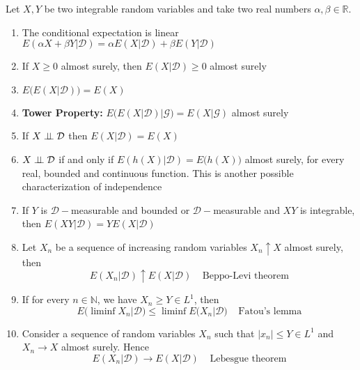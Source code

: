 \begin{proposition}
    Let $X,Y$ be two integrable random variables and take two real numbers $\alpha,\beta \in \mathbb{R}$. 
    \begin{enumerate}
        \item The conditional expectation is linear $E(\alpha X+\beta Y \vert \mathcal{D}) = \alpha E(X\vert \mathcal{D})+\beta E(Y \vert \mathcal{D})$
        \item If $X \geq 0$ almost surely, then $E(X \vert \mathcal{D}) \geq 0$ almost surely
        \item $E\big( E(X \vert \mathcal{D}) \big) = E(X)$
        \item \textbf{Tower Property:} $E\Big( E(X \vert \mathcal{D}) \vert \mathcal{G}\Big) = E( X \vert \mathcal{G} )$ almost surely
        \item If $X \perp \!\!\! \perp \mathcal{D}$ then $E(X \vert \mathcal{D}) = E(X)$
        \item $X \perp \!\!\! \perp \mathcal{D}$ if and only if $E(h(X) \vert \mathcal{D}) = E\big(h(X)\big)$ almost surely, for every real, bounded and continuous function. This is another possible characterization of independence
        \item If $Y$ is $\mathcal{D}-$measurable and bounded or $\mathcal{D}-$measurable and $XY$ is integrable, then $E(XY \vert \mathcal{D}) = Y E(X \vert \mathcal{D})$ 
        \item Let $X_n$ be a sequence of increasing random variables $X_n \uparrow X$ almost surely, then 
        \begin{equation}
            E(X_n \vert \mathcal{D}) \uparrow E(X \vert \mathcal{D}) \;\;\;\; \text{Beppo-Levi theorem}
        \end{equation}
        \item If for every $n \in \mathbb{N}$, we have $X_n \geq Y \in L^1$, then 
        \begin{equation}
            E\Big( \liminf X_n \big\vert \mathcal{D} \Big) \leq \liminf E\big( X_n \vert \mathcal{D} \big) \;\;\;\; \text{Fatou's lemma}
        \end{equation}
        \item Consider a sequence of random variables $X_n$ such that $\vert x_n \vert \leq Y \in L^1$ and $X_n \to X$ almost surely. Hence
        \begin{equation}
            E(X_n \vert \mathcal{D})  \to E(X \vert \mathcal{D}) \;\;\;\; \text{Lebesgue theorem}
        \end{equation}

\end{enumerate}
\end{proposition}

